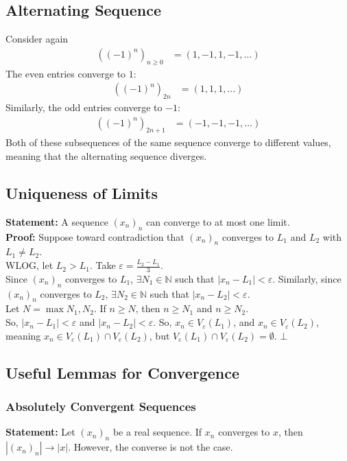 \documentclass[10pt]{extarticle}
\newcommand{\N}{\mathbb{N}}
\begin{document}
  \subsection{Alternating Sequence}%
    Consider again
    \begin{align*}
      \left((-1)^n\right)_{n\geq 0} &= (1,-1,1,-1,\dots)
    \end{align*}
    The even entries converge to $1$:
    \begin{align*}
      \left((-1)^n\right)_{2n} &= (1,1,1,\dots)
    \end{align*}
    Similarly, the odd entries converge to $-1$:
    \begin{align*}
      \left((-1)^n\right)_{2n+1} &= (-1,-1,-1,\dots)
    \end{align*}
    Both of these subsequences of the same sequence converge to different values, meaning that the alternating sequence diverges.
  \subsection{Uniqueness of Limits}%
  \textbf{Statement:} A sequence $\left(x_n\right)_n$ can converge to at most one limit.\\

  \textbf{Proof:} Suppose toward contradiction that $\left(x_n\right)_n$ converges to $L_1$ and $L_2$ with $L_1 \neq L_2$.\\

    WLOG, let $L_2 > L_1$. Take $\varepsilon = \frac{L_2 - L_1}{3}$. \\

    Since $(x_n)_n$ converges to $L_1$, $\exists N_1\in \N$ such that $|x_n - L_1| < \varepsilon$. Similarly, since $(x_n)_n$ converges to $L_2$, $\exists N_2\in \N$ such that $|x_n - L_2| < \varepsilon$.\\

    Let $N = \max{N_1,N_2}$. If $n \geq N$, then $n\geq N_1$ and $n\geq N_2$.\\

    So, $|x_n - L_1| < \varepsilon$ and $|x_n - L_2| < \varepsilon$. So, $x_n\in V_{\varepsilon}(L_1)$, and $x_n\in V_{\varepsilon}(L_2)$, meaning $x_n\in V_{\varepsilon}(L_1)\cap V_{\varepsilon}(L_2)$, but $V_{\varepsilon}(L_1)\cap V_{\varepsilon}(L_2) = \emptyset$. $\bot$
  \subsection{Useful Lemmas for Convergence}%
  \subsubsection{Absolutely Convergent Sequences}%
  \textbf{Statement:} Let $(x_n)_n$ be a real sequence. If $x_n$ converges to $x$, then $|(x_n)_n|\rightarrow |x|$. However, the converse is not the case.\\
\end{document}
